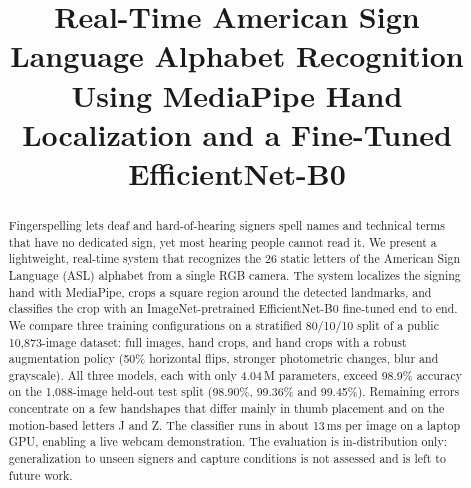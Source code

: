 \documentclass[conference]{IEEEtran}
\begin{document}
\title{Real-Time American Sign Language Alphabet Recognition Using MediaPipe Hand Localization and a Fine-Tuned EfficientNet-B0}

\author{
\and
{}
\and
{}
\and
{}
\and
{}
}

\maketitle

\begin{abstract}
Fingerspelling lets deaf and hard-of-hearing signers spell names and technical terms that have no dedicated sign, yet most hearing people cannot read it. We present a lightweight, real-time system that recognizes the 26 static letters of the American Sign Language (ASL) alphabet from a single RGB camera. The system localizes the signing hand with MediaPipe, crops a square region around the detected landmarks, and classifies the crop with an ImageNet-pretrained EfficientNet-B0 fine-tuned end to end. We compare three training configurations on a stratified 80/10/10 split of a public 10{,}873-image dataset: full images, hand crops, and hand crops with a robust augmentation policy (50\% horizontal flips, stronger photometric changes, blur and grayscale). All three models, each with only 4.04\,M parameters, exceed 98.9\% accuracy on the 1{,}088-image held-out test split (98.90\%, 99.36\% and 99.45\%). Remaining errors concentrate on a few handshapes that differ mainly in thumb placement and on the motion-based letters J and Z. The classifier runs in about 13\,ms per image on a laptop GPU, enabling a live webcam demonstration. The evaluation is in-distribution only: generalization to unseen signers and capture conditions is not assessed and is left to future work.
\end{abstract}
\end{document}

